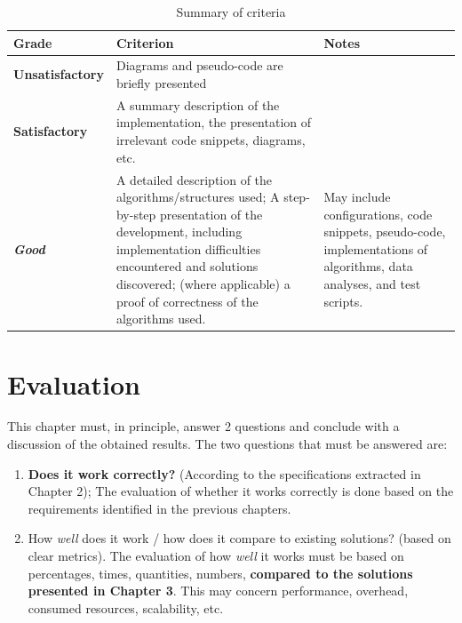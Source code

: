\documentclass[12pt,a4paper]{report}
\begin{document}
\begin{table}[th]\small\linespread{1}
\caption{Summary of criteria}
\label{tab:criterii}
\begin{tabular}{l >{\raggedright\arraybackslash}p{8cm} >{\raggedright\arraybackslash}p{4cm}}
\textbf{Grade} & \textbf{Criterion} & \textbf{Notes} \\\hline
\textbf{Unsatisfactory} & Diagrams and pseudo-code are briefly presented & \\\hline
\textbf{Satisfactory} &A summary description of the implementation, the presentation of irrelevant code snippets, diagrams, etc.& \\
\hline
\textbf{\textit{Good}} &A detailed description of the algorithms/structures used; A step-by-step presentation of the development, including implementation difficulties encountered and solutions discovered; (where applicable) a proof of correctness of the algorithms used. & May include configurations, code snippets, pseudo-code, implementations of algorithms, data analyses, and test scripts. \\
\hline
\end{tabular}
\end{table}


\chapter{Evaluation}
This chapter must, in principle, answer 2 questions and conclude with a discussion of the obtained results. The two questions that must be answered are:
\begin{enumerate}
	\item  \textbf{Does it work correctly?} (According to the specifications extracted in Chapter 2);
The evaluation of whether it works correctly is done based on the requirements identified in the previous chapters.

	\item How \textit{well} does it work / how does it compare to existing solutions? (based on clear metrics).
The evaluation of how \textit{well} it works must be based on percentages, times, quantities, numbers, \textbf{compared to the solutions presented in Chapter 3}. This may concern performance, overhead, consumed resources, scalability, etc.
\end{enumerate}
\end{document}
